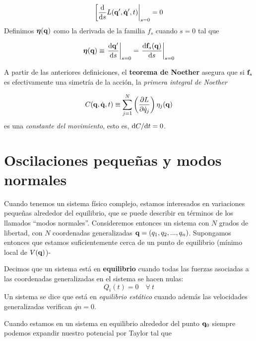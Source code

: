 \begin{equation}
	\eval[ \derivadas{}{s} L (\qn',\dot{\qn}',t) |_{s=0} = 0
\end{equation}
Definimos $\boldsymbol{\eta}(\mathbf{q})$ como la derivada de la familia $f_s$ cuando $s=0$ tal que 

\begin{equation}
	\etan (\qn) \equiv \eval{ \derivadas{\qn'}{s} }_{s=0} = \eval{ \derivadas{\fn_s(\qn)}{s} }_{s=0}
\end{equation}

\begin{teorema}
A partir de las anteriores definiciones, el \textbf{teorema de Noether} asegura que si $\mathbf{f}_s$ es efectivamente una simetría de la acción, la \textit{primera integral de Noether} 

\begin{equation}
	C(\mathbf{q},\dot{\mathbf{q}},t) \equiv \sum_{j=1}^N \left( \frac{\partial L}{\partial \dot{q}_j} \right) \eta_j (\mathbf{q}) 
\end{equation}
es una \textit{constante del movimiento}, esto es, $\mathrm{d} C / \mathrm{d} t = 0$. 
\end{teorema}

\section{Oscilaciones pequeñas y modos normales}

Cuando tenemos un sistema físico complejo, estamos interesados en variaciones pequeñas alrededor del equilibrio, que se puede describir en términos de los llamados ``modos normales''. Consideremos entonces un sistema con $N$ grados de libertad, con $N$ coordenadas generalizadas $\mathbf{q}=(q_1,q_2,...,q_n)$. Supongamos entonces que estamos suficientemente cerca de un punto de equilibrio (mínimo local de $V(\mathbf{q})$)- 

\begin{definicion}
	Decimos que un sistema está en \textbf{equilibrio} cuando todas las fuerzas asociadas a las coordenadas generalizadas en el sistema se hacen nulas:
	\begin{equation}
		Q_i(t)=0 \quad \forall \ t  
	\end{equation}
	Un sistema se dice que está en \textit{equilibrio estático} cuando además las velocidades generalizadas verifican $\dot{qn}=0$.
\end{definicion}

Cuando estamos en un sistema en equilibrio alrededor del punto $\mathbf{q}_0$ siempre podemos expandir nuestro potencial por Taylor tal que

